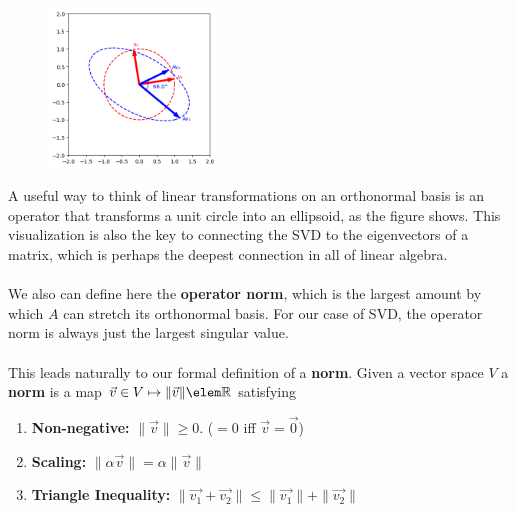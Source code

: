 \documentclass[11pt]{article}
\begin{document}
\begin{ideabox}
	\begin{figure}
	    \includegraphics[width=0.4\textwidth]{figs/ellipse.png}
	\end{figure}
	\ndent A useful way to think of linear transformations on an orthonormal basis is an operator that transforms a unit circle into an ellipsoid, as the figure shows. This visualization is also the key to connecting the SVD to the eigenvectors of a matrix, which is perhaps the deepest connection in all of linear algebra. 
	\\\\
\noindent We also can define here the \textbf{operator norm}, which is the largest amount by which $A$ can stretch its orthonormal basis. For our case of SVD, the operator norm is always just the largest singular value. \\ \\
\noindent This leads naturally to our formal definition of a \textbf{norm}. 
	Given a vector space $V$ a \textbf{norm} is a map $\vec{v} \in V \mapsto \|\vec{v}\| \elem \mathbb{R}$ satisfying
	\begin{enumerate}
		\item	\textbf{Non-negative: }$ \|\vec{v}\| \geq 0$. ($=0$ iff $\vec{v}=\vec{0}$) 
		\item \textbf{Scaling: }$ \|\alpha \vec{v}\| = \alpha \|\vec{v}\|$
		\item \textbf{Triangle Inequality: } $\|\vec{v_1} + \vec{v_2}\| \leq \|\vec{v_1}\| + \|\vec{v_2}\|$
	\end{enumerate}
\end{ideabox}
\end{document}
